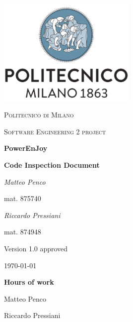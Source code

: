 \documentclass{report}
\begin{document}
\begin{titlepage}
	\centering
	\includegraphics[width=0.5\textwidth]{polimi-logo}\par\vspace{1cm}
	{\scshape\LARGE Politecnico di Milano\par}
	\vspace{1cm}
	{\scshape\Large Software Engineering 2 project\par}
	\vspace{1.5cm}
	{\Huge\bfseries PowerEnJoy\par}
	\vspace{0.5cm}
	{\Large\bfseries Code Inspection Document\par}
	\vspace{2cm}
	\begin{multicols}{2}
		{\Large\itshape Matteo Penco\par}
		\vspace{0.25cm}
		mat. 875740
		\vfill\columnbreak
		{\Large\itshape Riccardo Pressiani\par}
		\vspace{0.25cm}
		mat. 874948
	\end{multicols}
	
	\vfill
	
	{\Large Version 1.0 approved\par}
	\vspace{1.25cm}
	{\large \today\par}
\end{titlepage}

\begin{versionhistory}
\end{versionhistory}

\vspace{5cm}
{\noindent\Huge\bfseries Hours of work\par}
\vspace{0.5cm}
{\noindent Matteo Penco	\par}
{\noindent Riccardo Pressiani \par}
\end{document}
